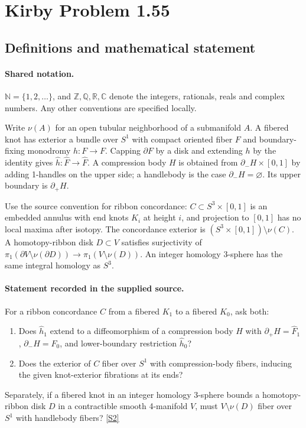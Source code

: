 \documentclass[11pt]{article}
\newcommand{\sref}[2]{\hyperlink{source:#1:#2}{[S#2]}}
\begin{document}
\section{Kirby Problem 1.55}\label{statement}

\subsection{Definitions and mathematical statement}

\paragraph{Shared notation.}$\mathbb N=\{1,2,\ldots\}$, and $\mathbb Z,\mathbb Q,\mathbb R,\mathbb C$ denote the integers, rationals, reals and complex numbers. Any other conventions are specified locally.


Write $\nu(A)$ for an open tubular neighborhood of a submanifold $A$. A fibered knot has exterior a bundle over $S^1$ with compact oriented fiber $F$ and boundary-fixing monodromy $h:F\to F$. Capping $\partial F$ by a disk and extending $h$ by the identity gives $\widehat h:\widehat F\to\widehat F$. A compression body $H$ is obtained from $\partial_-H\times[0,1]$ by adding 1-handles on the upper side; a handlebody is the case $\partial_-H=\varnothing$. Its upper boundary is $\partial_+H$.

Use the source convention for ribbon concordance: $C\subset S^3\times[0,1]$ is an embedded annulus with end knots $K_i$ at height $i$, and projection to $[0,1]$ has no local maxima after isotopy. The concordance exterior is $(S^3\times[0,1])\setminus\nu(C)$. A homotopy-ribbon disk $D\subset V$ satisfies surjectivity of $\pi_1(\partial V\setminus\nu(\partial D))\to\pi_1(V\setminus\nu(D))$. An integer homology 3-sphere has the same integral homology as $S^3$.
\paragraph{Statement recorded in the supplied source.}
For a ribbon concordance $C$ from a fibered $K_1$ to a fibered $K_0$, ask both:
\begin{enumerate}
\item Does $\widehat h_1$ extend to a diffeomorphism of a compression body $H$ with $\partial_+H=\widehat F_1$, $\partial_-H=\widehat F_0$, and lower-boundary restriction $\widehat h_0$?
\item Does the exterior of $C$ fiber over $S^1$ with compression-body fibers, inducing the given knot-exterior fibrations at its ends?
\end{enumerate}
Separately, if a fibered knot in an integer homology 3-sphere bounds a homotopy-ribbon disk $D$ in a contractible smooth 4-manifold $V$, must $V\setminus\nu(D)$ fiber over $S^1$ with handlebody fibers? \sref{statement}{2}
\end{document}

